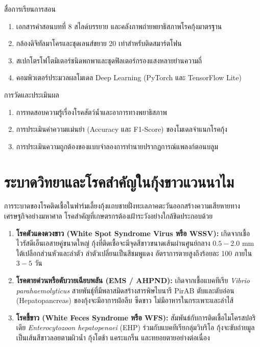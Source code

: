 \begin{planbox}{สื่อการเรียนการสอน}
\begin{enumerate}[topsep=2pt, itemsep=1pt, partopsep=0pt, parsep=0pt, leftmargin=1.5em]
    \item เอกสารคำสอนบทที่ 8 สไลด์บรรยาย และคลังภาพถ่ายพยาธิสภาพโรคกุ้งมาตรฐาน
    \item กล้องดิจิทัลมาโครและชุดเลนส์ขยาย 20 เท่าสำหรับติดสมาร์ตโฟน
    \item สเปกโตรโฟโตมิเตอร์ชนิดพกพาและชุดฟิลเตอร์กรองแสงหลายย่านความถี่
    \item คอมพิวเตอร์ประมวลผลโมเดล Deep Learning (PyTorch และ TensorFlow Lite)
\end{enumerate}
\end{planbox}

\begin{planbox}{การวัดและประเมินผล}
\begin{enumerate}[topsep=2pt, itemsep=1pt, partopsep=0pt, parsep=0pt, leftmargin=1.5em]
    \item การทดสอบความรู้เรื่องโรคสัตว์น้ำและอาการทางพยาธิสภาพ
    \item การประเมินค่าความแม่นยำ (Accuracy และ F1-Score) ของโมเดลจำแนกโรคกุ้ง
    \item การประเมินความถูกต้องของแบบจำลองการทำนายปรากฏการณ์แพลงก์ตอนบลูม
\end{enumerate}
\end{planbox}

\clearpage

\section{ระบาดวิทยาและโรคสำคัญในกุ้งขาวแวนนาไม}

การระบาดของโรคติดเชื้อในฟาร์มเลี้ยงกุ้งแถบชายฝั่งทะเลภาคตะวันออกสร้างความเสียหายทางเศรษฐกิจอย่างมหาศาล โรคสำคัญที่เกษตรกรต้องเฝ้าระวังอย่างใกล้ชิดประกอบด้วย
\begin{enumerate}[leftmargin=1.5em]
    \item \textbf{โรคตัวแดงดวงขาว (White Spot Syndrome Virus หรือ WSSV):} เกิดจากเชื้อไวรัสดีเอ็นเอสายคู่ขนาดใหญ่ กุ้งที่ติดเชื้อจะมีจุดสีขาวขนาดเส้นผ่านศูนย์กลาง $0.5 - 2.0\text{ mm}$ ใต้เปลือกส่วนหัวและลำตัว ลำตัวเปลี่ยนเป็นสีชมพูแดง อัตราการตายสูงถึงร้อยละ 100 ภายใน $3 - 5\text{ วัน}$
    \item \textbf{โรคตายด่วนหรือตับวายเฉียบพลัน (EMS / AHPND):} เกิดจากเชื้อแบคทีเรีย \textit{Vibrio parahaemolyticus} สายพันธุ์ที่มีพลาสมิดสร้างสารพิษไบนารี PirAB ตับและตับอ่อน (Hepatopancreas) ของกุ้งจะมีอาการฝ่อลีบ ซีดขาว ไม่มีอาหารในกระเพาะและลำไส้
    \item \textbf{โรคขี้ขาว (White Feces Syndrome หรือ WFS):} สัมพันธ์กับการติดเชื้อไมโครสปอริเดีย \textit{Enterocytozoon hepatopenaei} (EHP) ร่วมกับแบคทีเรียกลุ่มวิบริโอ กุ้งจะขับถ่ายมูลเป็นเส้นสีขาวลอยตามผิวน้ำ กุ้งโตช้า แคระแกร็น และทยอยตายอย่างต่อเนื่อง
\end{enumerate}

